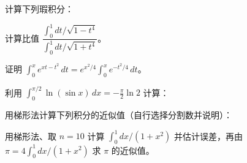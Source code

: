 \newpage
\noindent\begin{minipage}{\textwidth}
计算下列瑕积分：
\end{minipage}\par\vfill
\noindent\begin{minipage}{\textwidth}
计算比值 $\dfrac{\int_0^1 dt/\sqrt{1-t^4}}{\int_0^1 dt/\sqrt{1+t^4}}$。
\end{minipage}\par\vfill
\noindent\begin{minipage}{\textwidth}
证明 $\int_0^x e^{xt-t^2}\,dt=e^{x^2/4}\int_0^x e^{-t^2/4}\,dt$。
\end{minipage}\par\vfill
\newpage
\noindent\begin{minipage}{\textwidth}
利用 $\int_0^{\pi/2}\ln(\sin x)\,dx=-\frac\pi2\ln2$ 计算：
\end{minipage}\par\vfill
\noindent\begin{minipage}{\textwidth}
用梯形法计算下列积分的近似值（自行选择分割数并说明）：
\end{minipage}\par\vfill
\noindent\begin{minipage}{\textwidth}
用梯形法、取 $n=10$ 计算 $\int_0^1dx/(1+x^2)$ 并估计误差，再由 $\pi=4\int_0^1dx/(1+x^2)$ 求 $\pi$ 的近似值。
\end{minipage}\par\vfill
